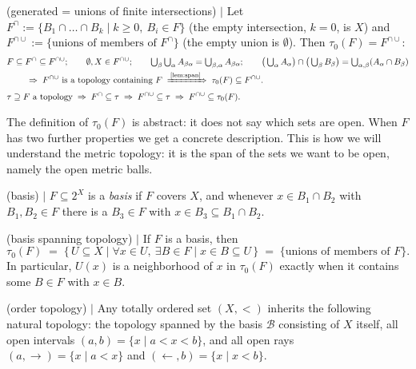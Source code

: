\begin{remark} (generated = unions of finite intersections) $\mid$ \label{rem:gen}
Let $F^{\cap} := \{B_1\cap\dots\cap B_k \mid k\ge0,\ B_i\in F\}$ (the empty
intersection, $k=0$, is $X$) and $F^{\cap\cup} := \{\text{unions of members of } F^{\cap}\}$
(the empty union is $\emptyset$). Then $\tau_0(F)=F^{\cap\cup}$:
\begin{align*}
&F\subseteq F^{\cap}\subseteq F^{\cap\cup};\qquad \emptyset,X\in F^{\cap\cup};\qquad
\textstyle\bigcup_\beta\bigcup_{\alpha} A_{\beta\alpha}=\bigcup_{\beta,\alpha}A_{\beta\alpha};\qquad
\big(\bigcup_\alpha A_\alpha\big)\cap\big(\bigcup_\beta B_\beta\big)=\bigcup_{\alpha,\beta}(A_\alpha\cap B_\beta)\\
&\qquad\;\Rightarrow\; F^{\cap\cup} \text{ is a topology containing } F \;\xRightarrow{\,\text{\scriptsize \ref{lem:span}}\,}\; \tau_0(F)\subseteq F^{\cap\cup}.\\
&\tau\supseteq F \text{ a topology} \;\Rightarrow\; F^{\cap}\subseteq\tau \;\Rightarrow\; F^{\cap\cup}\subseteq\tau
\;\Rightarrow\; F^{\cap\cup}\subseteq\tau_0(F).
\end{align*}
\end{remark}


The definition of $\tau_0(F)$ is abstract: it does not say which sets are open.
When $F$ has two further properties we get a concrete description. This is how
we will understand the metric topology: it is the span of the sets we want to
be open, namely the open metric balls.

\begin{definition} (basis) $\mid$
$F\subseteq 2^X$ is a \emph{basis} if $F$ covers $X$, and whenever
$x \in B_1 \cap B_2$ with $B_1,B_2 \in F$ there is a $B_3 \in F$ with
$x \in B_3 \subseteq B_1 \cap B_2$.
\end{definition}

\begin{theorem} (basis spanning topology) $\mid$ \label{thm:basis}
If $F$ is a basis, then
\[
\tau_0(F) \;=\; \{\, U \subseteq X \mid \forall x \in U,\ \exists B \in F
\mid x \in B \subseteq U \,\} \;=\; \{\text{unions of members of } F\}.
\]
In particular, $U(x)$ is a neighborhood of $x$ in $\tau_0(F)$ exactly when it
contains some $B\in F$ with $x\in B$.
\end{theorem}


\begin{theorem} (order topology) $\mid$ \label{thm:ordertop}
Any totally ordered set $(X,<)$ inherits the following natural topology: the
topology spanned by the basis $\mathcal B$ consisting of $X$ itself, all open
intervals $(a,b)=\{x\mid a<x<b\}$, and all open rays
$(a,\to)=\{x\mid a<x\}$ and $(\leftarrow,b)=\{x\mid x<b\}$.
\end{theorem}

